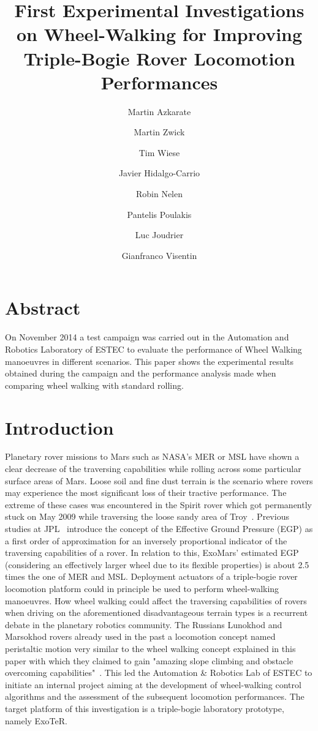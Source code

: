 \documentclass[a4paper,twocolumn]{esapub2005} %
\title{First Experimental Investigations on Wheel-Walking for Improving Triple-Bogie Rover Locomotion Performances}
\author{Martin Azkarate}
\author{Martin Zwick}
\author{Tim Wiese}
\author{Javier Hidalgo-Carrio}
\author{Robin Nelen}
\author{Pantelis Poulakis}
\author{Luc Joudrier}
\author{Gianfranco Visentin}
\affil{European Space Agency, ESA, Noordwijk, The Netherlands}
\affil{Technische Universit\"at M\"unchen, TUM, Munich, Germany}
\affil{Robotics Innovation Center, DFKI, Bremen, Germany}
\begin{document}

\maketitle

\section*{Abstract}
On November 2014 a test campaign was carried out in the Automation and Robotics Laboratory of ESTEC to evaluate the performance of Wheel Walking manoeuvres in different scenarios. This paper shows the experimental results obtained during the campaign and the performance analysis made when comparing wheel walking with standard rolling. 


\section{Introduction}
Planetary rover missions to Mars such as NASA’s MER or MSL have shown a clear decrease of the traversing capabilities while rolling across some particular surface areas of Mars. Loose soil and fine dust terrain is the scenario where rovers may experience the most significant loss of their tractive performance. The extreme of these cases was encountered in the Spirit rover which got permanently stuck on May 2009 while traversing the loose sandy area of Troy~\cite{SpiritTrap}.
Previous studies at JPL~\cite{ROB:ROB21481} introduce the concept of the Effective Ground Pressure (EGP) as a first order of approximation for an inversely proportional indicator of the traversing capabilities of a rover. In relation to this, ExoMars’ estimated EGP (considering an effectively larger wheel due to its flexible properties) is about 2.5 times the one of MER and MSL.
Deployment actuators of a triple-bogie rover locomotion platform could in principle be used to perform wheel-walking manoeuvres.  How wheel walking could affect the traversing capabilities of rovers when driving on the aforementioned disadvantageous terrain types is a recurrent debate in the planetary robotics community.
The Russians Lunokhod and Marsokhod rovers already used in the past a locomotion concept named peristaltic motion very similar to the wheel walking concept explained in this paper  with which they claimed to gain "amazing  slope climbing and obstacle overcoming capabilities"~\cite{Ehrenfreund1998}.
This led the Automation \& Robotics Lab of ESTEC to initiate an internal project aiming at the development of wheel-walking control algorithms and the assessment of the subsequent locomotion performances. The target platform of this investigation is a triple-bogie laboratory prototype, namely ExoTeR.
\end{document}
